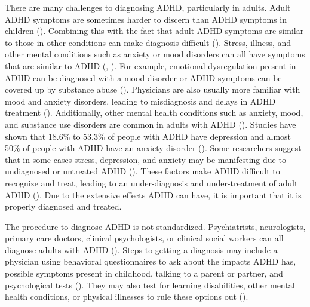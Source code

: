 \documentclass[,article,,moreauthors,pdftex]{mdpi}
\begin{document}
There are many challenges to diagnosing ADHD, particularly in adults.
Adult ADHD symptoms are sometimes harder to discern than ADHD symptoms
in children (\citet{noauthor_adult_nodate}). Combining this with the
fact that adult ADHD symptoms are similar to those in other conditions
can make diagnosis difficult (\citet{noauthor_adult_nodate}). Stress,
illness, and other mental conditions such as anxiety or mood disorders
can all have symptoms that are similar to ADHD
(\citet{noauthor_adult_nodate},
\citet{noauthor_attention-deficithyperactivity_nodate2}). For example,
emotional dysregulation present in ADHD can be diagnosed with a mood
disorder or ADHD symptoms can be covered up by substance abuse
(\citet{pmid28830387}). Physicians are also usually more familiar with
mood and anxiety disorders, leading to misdiagnosis and delays in ADHD
treatment (\citet{pmid28830387}). Additionally, other mental health
conditions such as anxiety, mood, and substance use disorders are common
in adults with ADHD
(\citet{noauthor_attention-deficithyperactivity_nodate2}). Studies have
shown that 18.6\% to 53.3\% of people with ADHD have depression and
almost 50\% of people with ADHD have an anxiety disorder
(\citet{pmid28830387}). Some researchers suggest that in some cases
stress, depression, and anxiety may be manifesting due to undiagnosed or
untreated ADHD (\citet{pmid28830387}). These factors make ADHD difficult
to recognize and treat, leading to an under-diagnosis and
under-treatment of adult ADHD (\citet{pmid28830387}). Due to the
extensive effects ADHD can have, it is important that it is properly
diagnosed and treated.

The procedure to diagnose ADHD is not standardized. Psychiatrists,
neurologists, primary care doctors, clinical psychologists, or clinical
social workers can all diagnose adults with ADHD
(\citet{contributors_diagnosing_nodate}). Steps to getting a diagnosis
may include a physician using behavioral questionnaires to ask about the
impacts ADHD has, possible symptoms present in childhood, talking to a
parent or partner, and psychological tests
(\citet{contributors_diagnosing_nodate}). They may also test for
learning disabilities, other mental health conditions, or physical
illnesses to rule these options out
(\citet{contributors_diagnosing_nodate}).
\end{document}
